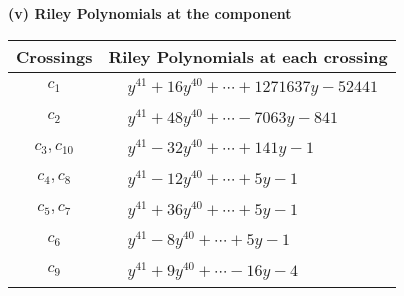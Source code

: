 \documentclass[1p]{elsarticle_modified}
\theoremstyle{definition}
\begin{document}
\newpage\renewcommand{\arraystretch}{1}
\flushleft \textbf{(v) Riley Polynomials at the component}\newline \\
\begin{tabular}{m{50pt}|m{274pt}}
Crossings & \hspace{64pt}Riley Polynomials at each crossing \\
\hline $$\begin{aligned}c_{1}\end{aligned}$$&$\begin{aligned}
&y^{41}+16 y^{40}+\cdots+1271637 y-52441
\end{aligned}$\\
\hline $$\begin{aligned}c_{2}\end{aligned}$$&$\begin{aligned}
&y^{41}+48 y^{40}+\cdots-7063 y-841
\end{aligned}$\\
\hline $$\begin{aligned}c_{3},c_{10}\end{aligned}$$&$\begin{aligned}
&y^{41}-32 y^{40}+\cdots+141 y-1
\end{aligned}$\\
\hline $$\begin{aligned}c_{4},c_{8}\end{aligned}$$&$\begin{aligned}
&y^{41}-12 y^{40}+\cdots+5 y-1
\end{aligned}$\\
\hline $$\begin{aligned}c_{5},c_{7}\end{aligned}$$&$\begin{aligned}
&y^{41}+36 y^{40}+\cdots+5 y-1
\end{aligned}$\\
\hline $$\begin{aligned}c_{6}\end{aligned}$$&$\begin{aligned}
&y^{41}-8 y^{40}+\cdots+5 y-1
\end{aligned}$\\
\hline $$\begin{aligned}c_{9}\end{aligned}$$&$\begin{aligned}
&y^{41}+9 y^{40}+\cdots-16 y-4
\end{aligned}$\\
\hline
\end{tabular}\\~\\
\end{document}
